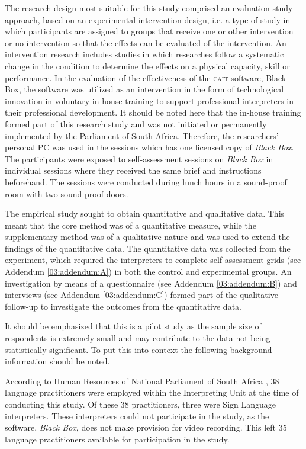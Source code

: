 \documentclass[output=paper]{langsci/langscibook}
\begin{document}
The research design most suitable for this study comprised an evaluation study approach, based on an experimental intervention design, i.e. a type of study in which participants are assigned to groups that receive one or other intervention or no intervention so that the effects can be evaluated of the intervention. An intervention research includes studies in which researches follow a systematic change in the condition to determine the effects on a physical capacity, skill or performance. In the evaluation of the effectiveness of the \textsc{cait} software, Black Box, the software was utilized as an intervention in the form of technological innovation in voluntary in-house training to support professional interpreters in their professional development. It should be noted here that the in-house training formed part of this research study and was not initiated or permanently implemented by the Parliament of South Africa. Therefore, the researchers’ personal PC was used in the sessions which has one licensed copy of \textit{Black Box}. The participants were exposed to self-assessment sessions on \textit{Black Box} in individual sessions where they received the same brief and instructions beforehand. The sessions were conducted during lunch hours in a sound-proof room with two sound-proof doors. 

The empirical study sought to obtain quantitative and qualitative data. This meant that the core method was of a quantitative measure, while the supplementary method was of a qualitative nature and was used to extend the findings of the quantitative data. The quantitative data was collected from the experiment, which required the interpreters to complete self-assessment grids (see Addendum \ref{03:addendum:A}) in both the control and experimental groups. An investigation by means of a questionnaire (see Addendum \ref{03:addendum:B}) and interviews (see Addendum \ref{03:addendum:C}) formed part of the qualitative follow-up to investigate the outcomes from the quantitative data.

It should be emphasized that this is a pilot study as the sample size of respondents is extremely small and may contribute to the data not being statistically significant. To put this into context the following background information should be noted. 

According to Human Resources of National Parliament of South Africa \citep{Moorad2017}, 38 language practitioners were employed within the Interpreting Unit at the time of conducting this study. Of these 38 practitioners, three were Sign Language interpreters. These interpreters could not participate in the study, as the software, \textit{Black Box}, does not make provision for video recording. This left 35 language practitioners available for participation in the study. 
\end{document}
